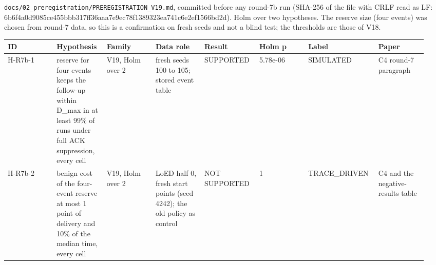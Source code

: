 \texttt{docs/02\_preregistration/PREREGISTRATION\_V19.md}, committed before any round-7b run (SHA-256 of the file with CRLF read as LF: 6b6f4a0d9085ce455bbb317ff36aaa7e9ec78f1389323ea741c6e2ef1566bd2d). Holm over two hypotheses. The reserve size (four events) was chosen from round-7 data, so this is a confirmation on fresh seeds and not a blind test; the thresholds are those of V18.

{\scriptsize\raggedright
\begin{longtable}{p{0.119\linewidth}p{0.119\linewidth}p{0.119\linewidth}p{0.119\linewidth}p{0.119\linewidth}p{0.119\linewidth}p{0.119\linewidth}p{0.119\linewidth}}
\toprule
ID & Hypothesis & Family & Data role & Result & Holm p & Label & Paper \\
\midrule
\endhead
H-R7b-1 & reserve for four events keeps the follow-up within D\_max in at least 99\% of runs under full ACK suppression, every cell & V19, Holm over 2 & fresh seeds 100 to 105; stored event table & SUPPORTED & 5.78e-06 & SIMULATED & C4 round-7 paragraph \\
H-R7b-2 & benign cost of the four-event reserve at most 1 point of delivery and 10\% of the median time, every cell & V19, Holm over 2 & LoED half 0, fresh start points (seed 4242); the old policy as control & NOT SUPPORTED & 1 & TRACE\_DRIVEN & C4 and the negative-results table \\
\bottomrule
\end{longtable}}

